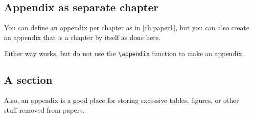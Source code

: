 
\begin{appendices}

    \chapter{Appendix as separate chapter}
    \label{app:seperate}

    You can define an appendix per chapter as in \autoref{ch:paper1},
    but you can also create an appendix that is a chapter by itself
    as done here.
    
    Either way works, but do not use the \verb|\appendix| function to make
    an appendix.
    
    \section{A section}
    Also, an appendix is a good place for storing excessive tables, figures, 
    or other stuff removed from papers.
    
\end{appendices}

